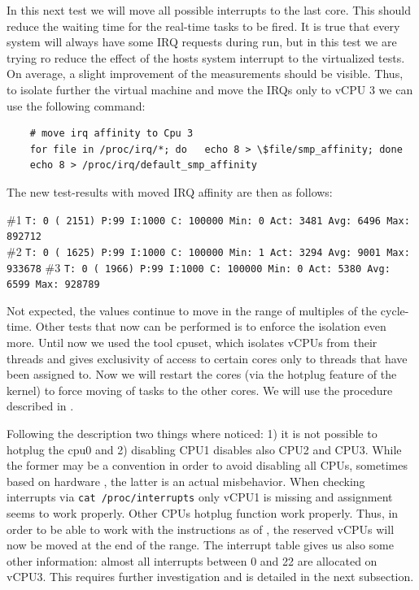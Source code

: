 \documentclass[]{scrartcl}
\begin{document}
In this next test we will move all possible interrupts to the last core. This should reduce the waiting time for the real-time tasks to be fired.
It is true that every system will always have some IRQ requests during run, but in this test we are trying ro reduce the effect of the hosts system interrupt to the virtualized tests.
On average, a slight improvement of the measurements should be visible.
Thus, to isolate further the virtual machine and move the IRQs only to vCPU 3 we can use the following command: 

\begin{verbatim}
	# move irq affinity to Cpu 3
	for file in /proc/irq/*; do   echo 8 > \$file/smp_affinity; done
	echo 8 > /proc/irq/default_smp_affinity
\end{verbatim}

\noindent The new test-results with moved IRQ affinity are then as follows:
 
\noindent \small \#1 \texttt{T: 0 ( 2151) P:99 I:1000 C: 100000 Min: 0 Act: 3481 Avg: 6496 Max:  892712}\\
\noindent \small \#2 \texttt{T: 0 ( 1625) P:99 I:1000 C: 100000 Min: 1 Act: 3294 Avg: 9001 Max:  933678}
\noindent \small \#3 \texttt{T: 0 ( 1966) P:99 I:1000 C: 100000 Min: 0 Act: 5380 Avg: 6599 Max:  928789}

Not expected, the values continue to move in the range of multiples of the cycle-time. Other tests that now can be performed is to enforce the isolation even more. Until now we used the tool cpuset, which isolates vCPUs from their threads and gives exclusivity of access to certain cores only to threads that have been assigned to.
Now we will restart the cores (via the hotplug feature of the kernel) to force moving of tasks to the other cores. We will use the procedure described in \cite{lrt02}.

Following the description two things where noticed: 1) it is not possible to hotplug the cpu0 and 2) disabling CPU1 disables also CPU2 and CPU3.
While the former may be a convention in order to avoid disabling all CPUs, sometimes based on hardware \cite{lwn01}, the latter is an actual misbehavior. 
When checking interrupts via \texttt{cat /proc/interrupts} only vCPU1 is missing and assignment seems to work properly. Other CPUs hotplug function work properly. 
Thus, in order to be able to work with the instructions as of \cite{lwn01}, the reserved vCPUs will now be moved at the end of the range. 
The interrupt table gives us also some other information: almost all interrupts between 0 and 22 are allocated on vCPU3. This requires further investigation and is detailed in the next subsection.
\end{document}
